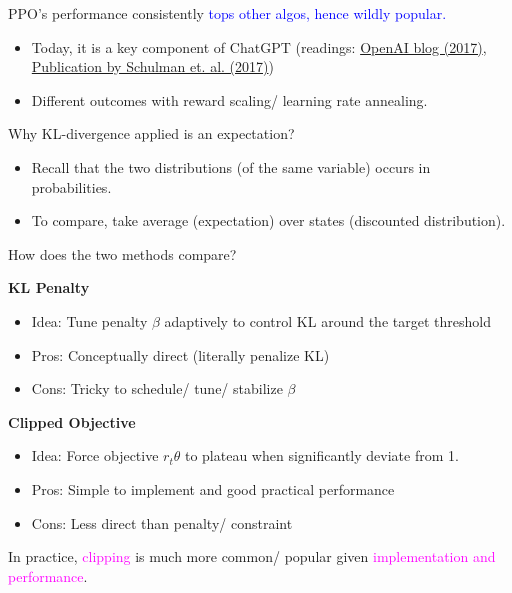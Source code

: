 \documentclass{article}
\begin{document}
PPO's performance consistently \textcolor{blue}{tops other algos, hence wildly popular.}
\begin{itemize}
\item Today, it is a key component of ChatGPT (readings: \href{https://openai.com/index/openai-baselines-ppo/}{OpenAI blog (2017)}, \href{https://arxiv.org/pdf/1707.06347}{Publication by Schulman et. al. (2017)})
\item Different outcomes with reward scaling/ learning rate annealing.
\end{itemize}

\begin{hintbox}
    Why KL-divergence applied is an expectation?
    \begin{prfbox}
        \begin{itemize}
        \item Recall that the two distributions (of the same variable) occurs in probabilities.
        \item To compare, take average (expectation) over states (discounted distribution). 
        \end{itemize}
    \end{prfbox}
    How does the two methods compare?
    \begin{prfbox}
        \textbf{KL Penalty}
        \begin{itemize}
        \item Idea: Tune penalty $\beta$ adaptively to control KL around the target threshold
        \item Pros: Conceptually direct (literally penalize KL)
        \item Cons: Tricky to schedule/ tune/ stabilize $\beta$
        \end{itemize}

        \textbf{Clipped Objective}
        \begin{itemize}
            \item Idea: Force objective $r_{t} \theta$ to plateau when significantly deviate from 1.
            \item Pros: Simple to implement and good practical performance
            \item Cons: Less direct than penalty/ constraint
        \end{itemize}
        In practice, \textcolor{magenta}{clipping} is much more common/ popular given \textcolor{magenta}{implementation and performance}.
    \end{prfbox}
\end{hintbox}
\end{document}
